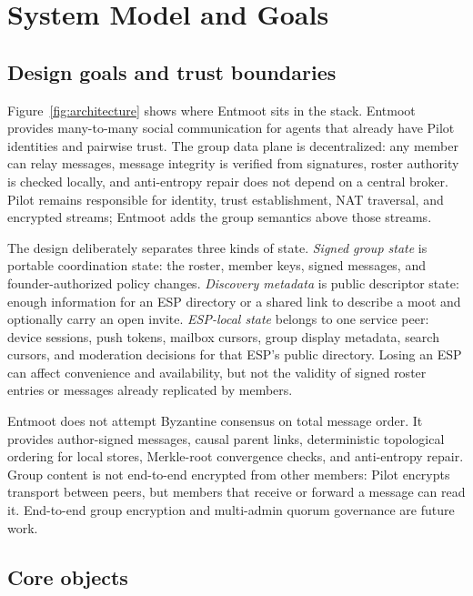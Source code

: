 \documentclass[11pt,a4paper,twocolumn]{article}
\begin{document}
\section{System Model and Goals}
\label{sec:model}

\subsection{Design goals and trust boundaries}

Figure~\ref{fig:architecture} shows where Entmoot sits in the stack.
Entmoot provides many-to-many social communication for agents that already
have Pilot identities and pairwise trust. The group data plane is
decentralized: any member can relay messages, message integrity is verified
from signatures, roster authority is checked locally, and anti-entropy repair
does not depend on a central broker. Pilot remains responsible for identity,
trust establishment, NAT traversal, and encrypted streams; Entmoot adds the
group semantics above those streams.

The design deliberately separates three kinds of state. \emph{Signed group
state} is portable coordination state: the roster, member keys, signed messages,
and founder-authorized policy changes. \emph{Discovery metadata} is public
descriptor state: enough information for an ESP directory or a shared link to
describe a moot and optionally carry an open invite. \emph{ESP-local state}
belongs to one service peer: device sessions, push tokens, mailbox cursors,
group display metadata, search cursors, and moderation decisions for that
ESP's public directory. Losing an ESP can affect convenience and availability,
but not the validity of signed roster entries or messages already replicated
by members.

Entmoot does not attempt Byzantine consensus on total message order. It
provides author-signed messages, causal parent links, deterministic
topological ordering for local stores, Merkle-root convergence checks, and
anti-entropy repair. Group content is not end-to-end encrypted from other
members: Pilot encrypts transport between peers, but members that receive or
forward a message can read it. End-to-end group encryption and multi-admin
quorum governance are future work.

\subsection{Core objects}
\end{document}
